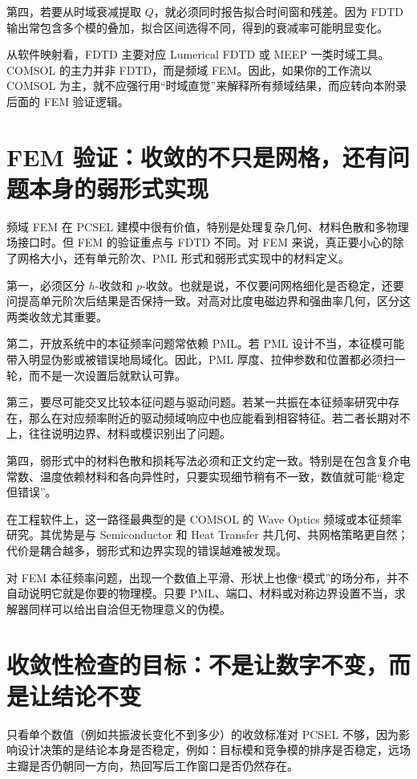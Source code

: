 第四，若要从时域衰减提取 $Q$，就必须同时报告拟合时间窗和残差。因为 FDTD 输出常包含多个模的叠加，拟合区间选得不同，得到的衰减率可能明显变化。

从软件映射看，FDTD 主要对应 Lumerical FDTD 或 MEEP 一类时域工具。COMSOL 的主力并非 FDTD，而是频域 FEM。因此，如果你的工作流以 COMSOL 为主，就不应强行用“时域直觉”来解释所有频域结果，而应转向本附录后面的 FEM 验证逻辑。

\section{FEM 验证：收敛的不只是网格，还有问题本身的弱形式实现}
频域 FEM 在 PCSEL 建模中很有价值，特别是处理复杂几何、材料色散和多物理场接口时。但 FEM 的验证重点与 FDTD 不同。对 FEM 来说，真正要小心的除了网格大小，还有单元阶次、PML 形式和弱形式实现中的材料定义。

第一，必须区分 $h$-收敛和 $p$-收敛。也就是说，不仅要问网格细化是否稳定，还要问提高单元阶次后结果是否保持一致。对高对比度电磁边界和强曲率几何，区分这两类收敛尤其重要。

第二，开放系统中的本征频率问题常依赖 PML。若 PML 设计不当，本征模可能带入明显伪影或被错误地局域化。因此，PML 厚度、拉伸参数和位置都必须扫一轮，而不是一次设置后就默认可靠。

第三，要尽可能交叉比较本征问题与驱动问题。若某一共振在本征频率研究中存在，那么在对应频率附近的驱动频域响应中也应能看到相容特征。若二者长期对不上，往往说明边界、材料或模识别出了问题。

第四，弱形式中的材料色散和损耗写法必须和正文约定一致。特别是在包含复介电常数、温度依赖材料和各向异性时，只要实现细节稍有不一致，数值就可能“稳定但错误”。

在工程软件上，这一路径最典型的是 COMSOL 的 Wave Optics 频域或本征频率研究。其优势是与 Semiconductor 和 Heat Transfer 共几何、共网格策略更自然；代价是耦合越多，弱形式和边界实现的错误越难被发现。

对 FEM 本征频率问题，出现一个数值上平滑、形状上也像“模式”的场分布，并不自动说明它就是你要的物理模。只要 PML、端口、材料或对称边界设置不当，求解器同样可以给出自洽但无物理意义的伪模。

\section{收敛性检查的目标：不是让数字不变，而是让结论不变}
只看单个数值（例如共振波长变化不到多少）的收敛标准对 PCSEL 不够，因为影响设计决策的是结论本身是否稳定，例如：目标模和竞争模的排序是否稳定，远场主瓣是否仍朝同一方向，热回写后工作窗口是否仍然存在。

